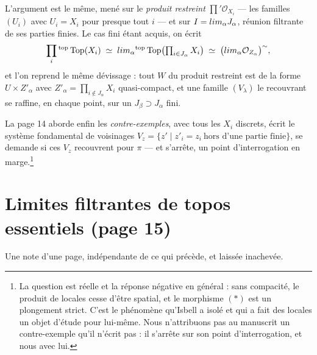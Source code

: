 \documentclass[11pt,a4paper]{article}
\begin{document}
L'argument est le même, mené sur le \emph{produit restreint}
$\prod' \mathcal{O}_{X_{i}}$ — les familles $(U_{i})$ avec $U_{i} = X_{i}$ pour
presque tout $i$ — et sur $I = \varinjlim_{\alpha} J_{\alpha}$, réunion filtrante
de ses parties finies. Le cas fini étant acquis, on écrit
\[
\prod_{i}{}^{\mathrm{top}} \operatorname{Top}(X_{i})
\;\simeq\; \varprojlim_{\alpha}{}^{\mathrm{top}}
\operatorname{Top}\bigl(\textstyle\prod_{i \in J_{\alpha}} X_{i}\bigr)
\;\simeq\; \bigl(\varinjlim_{\alpha} \mathcal{O}_{Z_{\alpha}}\bigr)^{\sim},
\]
et l'on reprend le même dévissage : tout $W$ du produit restreint est de la
forme $U \times Z'_{\alpha}$ avec $Z'_{\alpha} = \prod_{i \notin J_{\alpha}} X_{i}$
quasi-compact, et une famille $(V_{\lambda})$ le recouvrant se raffine, en
chaque point, sur un $J_{\beta} \supset J_{\alpha}$ fini.

La page 14 aborde enfin les \emph{contre-exemples}, avec tous les $X_{i}$
discrets, écrit le système fondamental de voisinages
$V_{z} = \{z' \mid z'_{i} = z_{i}\ \text{hors d'une partie finie}\}$, se demande
si ces $V_{z}$ recouvrent pour $\pi$ — et s'arrête, un point d'interrogation en
marge.\footnote{La question est réelle et la réponse négative en général : sans
compacité, le produit de locales cesse d'être spatial, et le morphisme $(*)$
est un plongement strict. C'est le phénomène qu'Isbell a isolé et qui a fait
des locales un objet d'étude pour lui-même. Nous n'attribuons pas au manuscrit
un contre-exemple qu'il n'écrit pas : il s'arrête sur son point
d'interrogation, et nous avec lui.}

\section*{Limites filtrantes de topos essentiels (page 15)}

Une note d'une page, indépendante de ce qui précède, et laissée inachevée.
\end{document}
